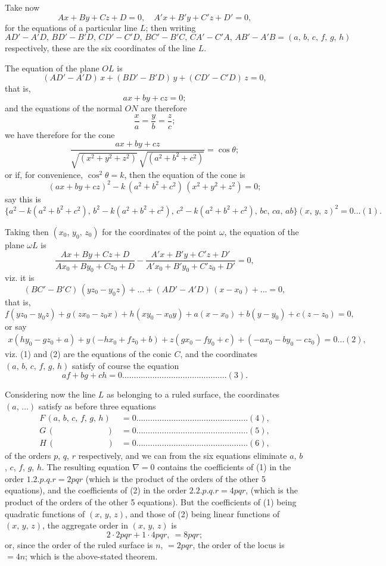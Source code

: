 \documentclass[11pt,a4paper]{article}
\theoremstyle{plain}
\theoremstyle{definition}
\theoremstyle{remark}
\begin{document}
Take now
\[
Ax + By + Cz + D = 0,\quad A'x + B'y + C'z + D' = 0,
\]
for the equations of a particular line $L$; then writing
\[
AD'-A'D,\, BD'-B'D,\, CD'-C'D,\, BC'-B'C,\, CA'-C'A,\, AB'-A'B = (a,\,b,\,c,\,f,\,g,\,h)
\]
respectively, these are the six coordinates of the line $L$.

The equation of the plane $OL$ is
\[
(AD'-A'D)\,x + (BD'-B'D)\,y + (CD'-C'D)\,z = 0,
\]
that is,
\[
ax + by + cz = 0;
\]
and the equations of the normal $ON$ are therefore
\[
\frac{x}{a} = \frac{y}{b} = \frac{z}{c};
\]
we have therefore for the cone
\[
\frac{ax+by+cz}{\sqrt{(x^2+y^2+z^2)}\,\sqrt{(a^2+b^2+c^2)}} = \cos\theta;
\]
or if, for convenience, $\cos^2\theta = k$, then the equation of the cone is
\[
(ax+by+cz)^2 - k\,(a^2+b^2+c^2)\,(x^2+y^2+z^2) = 0;
\]
say this is
\[
\{a^2-k(a^2+b^2+c^2),\, b^2-k(a^2+b^2+c^2),\, c^2-k(a^2+b^2+c^2),\, bc,\, ca,\, ab\}(x,\,y,\,z)^2 = 0\ldots(1).
\]

Taking then $(x_0,\,y_0,\,z_0)$ for the coordinates of the point $\omega$, the equation of the plane $\omega L$ is
\[
\frac{Ax+By+Cz+D}{Ax_0+By_0+Cz_0+D} - \frac{A'x+B'y+C'z+D'}{A'x_0+B'y_0+C'z_0+D'} = 0,
\]
viz. it is
\[
(BC'-B'C)\,(yz_0-y_0z) + \ldots + (AD'-A'D)\,(x-x_0) + \ldots = 0,
\]
that is,
\[
f(yz_0-y_0z) + g(zx_0-z_0x) + h(xy_0-x_0y) + a(x-x_0) + b(y-y_0) + c(z-z_0) = 0,
\]
or say
\begin{multline*}
x(hy_0-gz_0+a) + y(-hx_0+fz_0+b) + z(gx_0-fy_0+c) + (-ax_0-by_0-cz_0) = 0\ldots(2),
\end{multline*}
viz. (1) and (2) are the equations of the conic $C$, and the coordinates $(a,\,b,\,c,\,f,\,g,\,h)$ satisfy of course the equation
\[
af + bg + ch = 0\ldots\ldots\ldots\ldots\ldots\ldots\ldots\ldots\ldots\ldots\ldots\ldots\ldots\ldots\ldots(3).
\]

Considering now the line $L$ as belonging to a ruled surface, the coordinates $(a,\,\ldots)$ satisfy as before three equations
\begin{align*}
F\,(a,\,b,\,c,\,f,\,g,\,h) &= 0\ldots\ldots\ldots\ldots\ldots\ldots\ldots\ldots\ldots\ldots\ldots\ldots\ldots\ldots\ldots\ldots(4),\\
G\,(\phantom{a,\,b,\,c,\,}\quad\quad\quad) &= 0\ldots\ldots\ldots\ldots\ldots\ldots\ldots\ldots\ldots\ldots\ldots\ldots\ldots\ldots\ldots\ldots(5),\\
H\,(\phantom{a,\,b,\,c,\,}\quad\quad\quad) &= 0\ldots\ldots\ldots\ldots\ldots\ldots\ldots\ldots\ldots\ldots\ldots\ldots\ldots\ldots\ldots\ldots(6),
\end{align*}
of the orders $p$, $q$, $r$ respectively, and we can from the six equations eliminate $a$, $b$, $c$, $f$, $g$, $h$. The resulting equation $\nabla=0$ contains the coefficients of (1) in the order $1.2.p.q.r = 2pqr$ (which is the product of the orders of the other 5 equations), and the coefficients of (2) in the order $2.2.p.q.r = 4pqr$, (which is the product of the orders of the other 5 equations). But the coefficients of (1) being quadratic functions of $(x,\,y,\,z)$, and those of (2) being linear functions of $(x,\,y,\,z)$, the aggregate order in $(x,\,y,\,z)$ is
\[
2\cdot 2pqr + 1\cdot 4pqr,\ = 8pqr;
\]
or, since the order of the ruled surface is $n$, $= 2pqr$, the order of the locus is $= 4n$; which is the above-stated theorem.
\end{document}
